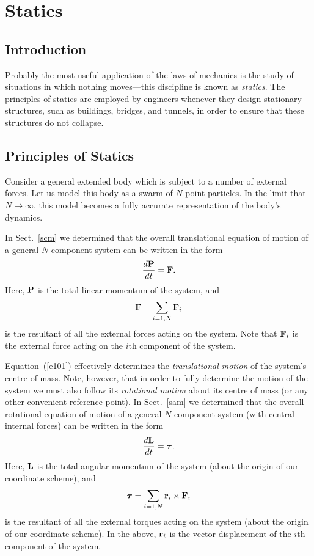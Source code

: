 \section{Statics}
\subsection{Introduction}
Probably the most useful application of the laws of mechanics is the study
of situations in which nothing moves---this discipline is known as {\em statics}. 
The principles of statics are employed by engineers whenever they design 
stationary structures, such as buildings,
bridges, and tunnels, in order to ensure that these
structures do not collapse.

\subsection{Principles of Statics}
Consider a general extended body which is subject to a number of external forces. 
Let us model this body as a swarm of $N$ point particles. In the limit that
$N\rightarrow\infty$, this model becomes a fully accurate representation of the body's
dynamics.

In Sect.~\ref{scm} we determined that the overall translational equation
of motion of a general $N$-component system  can
be written in the form
\begin{equation}\label{e101}
\frac{d{\bf P}}{dt} = {\bf F}.
\end{equation}
Here, ${\bf P}$ is the total linear momentum of the system, and
\begin{equation}
{\bf F} =  \sum_{i=1,N} {\bf F}_i
\end{equation}
is the resultant of all the external forces acting on the system. Note that ${\bf F}_i$
is the external force acting on the $i$th component of the system.

Equation~(\ref{e101}) effectively determines the {\em translational motion} of the system's centre of mass.
Note, however, that in order to fully determine the motion of the system we must also follow its
{\em rotational motion}  about its centre of mass (or any other convenient reference point).
In Sect.~\ref{sam} we determined that the overall rotational equation of motion
of a general $N$-component system (with central internal forces) can
be written in the form
\begin{equation}\label{e102}
\frac{d {\bf L}}{dt} = \mbox{\boldmath$\tau$}.
\end{equation}
Here, ${\bf L}$ is the total angular momentum of the system (about the origin of
our coordinate scheme), and
\begin{equation}
\mbox{\boldmath$\tau$} = \sum_{i=1,N} {\bf r}_i\times {\bf F}_i
\end{equation}
is the resultant of all the external torques acting on the system (about the
origin of our coordinate scheme). In the above, ${\bf r}_i$ is the vector
displacement of the $i$th component of the system.

